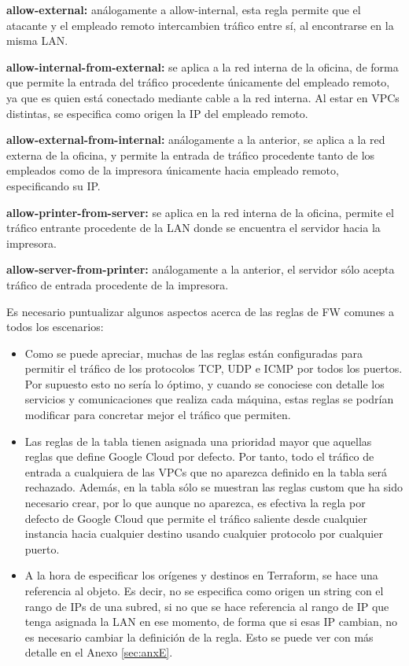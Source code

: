   \textbf{allow-external:} análogamente a allow-internal, esta regla permite que el atacante y el empleado remoto intercambien tráfico entre sí, al encontrarse en la misma LAN.

  \textbf{allow-internal-from-external:} se aplica a la red interna de la oficina, de forma que permite la entrada del tráfico procedente únicamente del empleado remoto, ya que es quien está conectado mediante cable a la red interna. Al estar en VPCs distintas, se especifica como origen la IP del empleado remoto. 

  \textbf{allow-external-from-internal:} análogamente a la anterior, se aplica a la red externa de la oficina, y permite la entrada de tráfico procedente tanto de los empleados como de la impresora únicamente hacia empleado remoto, especificando su IP. 

  \textbf{allow-printer-from-server:} se aplica en la red interna de la oficina, permite el tráfico entrante procedente de la LAN donde se encuentra el servidor hacia la impresora.

  \textbf{allow-server-from-printer:} análogamente a la anterior, el servidor sólo acepta tráfico de entrada procedente de la impresora.

  Es necesario puntualizar algunos aspectos acerca de las reglas de FW comunes a todos los escenarios:

  \begin{itemize}
    \item Como se puede apreciar, muchas de las reglas están configuradas para permitir el tráfico de los protocolos TCP, UDP e ICMP por todos los puertos. Por supuesto esto no sería lo óptimo, y cuando se conociese con detalle los servicios y comunicaciones que realiza cada máquina, estas reglas se podrían modificar para  concretar mejor el tráfico que permiten. 

    \item Las reglas de la tabla tienen asignada una prioridad mayor que aquellas reglas que define Google Cloud por defecto. Por tanto, todo el tráfico de entrada a cualquiera de las VPCs que no aparezca definido en la tabla será rechazado. Además, en la tabla sólo se muestran las reglas custom que ha sido necesario crear, por lo que aunque no aparezca, es efectiva la regla por defecto de Google Cloud que permite el tráfico saliente desde cualquier instancia hacia cualquier destino usando cualquier protocolo por cualquier puerto.

    \item A la hora de especificar los orígenes y destinos en Terraform, se hace una referencia al objeto. Es decir, no se especifica como origen un string con el rango de IPs de una subred, si no que se hace referencia al rango de IP que tenga asignada la LAN en ese momento, de forma que si esas IP cambian, no es necesario cambiar la definición de la regla. Esto se puede ver con más detalle en el Anexo \ref{sec:anxE}.
  \end{itemize}

